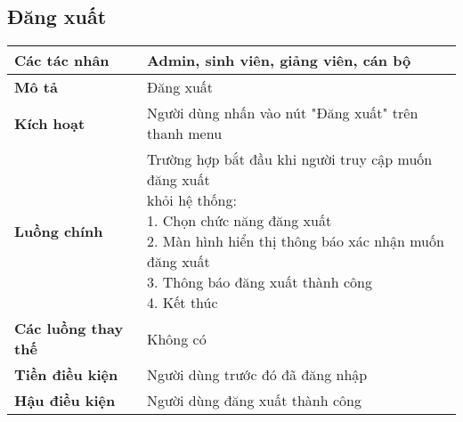 \subsection*{Đăng xuất}
	\begin{tabular}{|l|p{}|}
		\hline
		\textbf{Các tác nhân}         & Admin, sinh viên, giảng viên, cán bộ                              \\
		\hline
		\textbf{Mô tả}                & Đăng xuất                                                                        \\
		\hline
		\textbf{Kích hoạt}            & Người dùng nhấn vào nút "Đăng xuất" trên thanh menu                              \\
		\hline
		\textbf{Luồng chính}           & \makecell[l]{Trường hợp bắt đầu khi người truy cập muốn đăng xuất \\ khỏi hệ thống: \\ 1. Chọn chức năng đăng xuất \\ 2. Màn hình hiển thị thông báo xác nhận muốn đăng xuất \\ 3. Thông báo đăng xuất thành công \\ 4. Kết thúc} \\
		\hline
		\textbf{Các luồng thay thế}   & Không có                                                                         \\
		\hline
		\textbf{Tiền điều kiện}       & Người dùng trước đó đã đăng nhập                                                 \\
		\hline
		\textbf{Hậu điều kiện}        & Người dùng đăng xuất thành công                                                  \\
		\hline
	\end{tabular}


